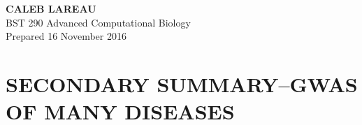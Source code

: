 \documentclass[12pt]{article}
\begin{document}
\begin{minipage}[t]{0.5\linewidth}
    \begin{flushleft}
    \textbf{
    {\huge C}{\Large ALEB} \hspace{-0.1em} 
    {\huge L}{\Large AREAU}}\\
     \hspace*{4mm} BST 290 Advanced Computational Biology \\
     \hspace*{4mm} Prepared 16 November 2016
         \end{flushleft}
\end{minipage}


\section*{\textbf{{\Large S}{\small ECONDARY} {\Large S}{\small UMMARY}{\Large --G}{\small WAS OF MANY }{\Large D}{\small ISEASES} }}
\end{document}
